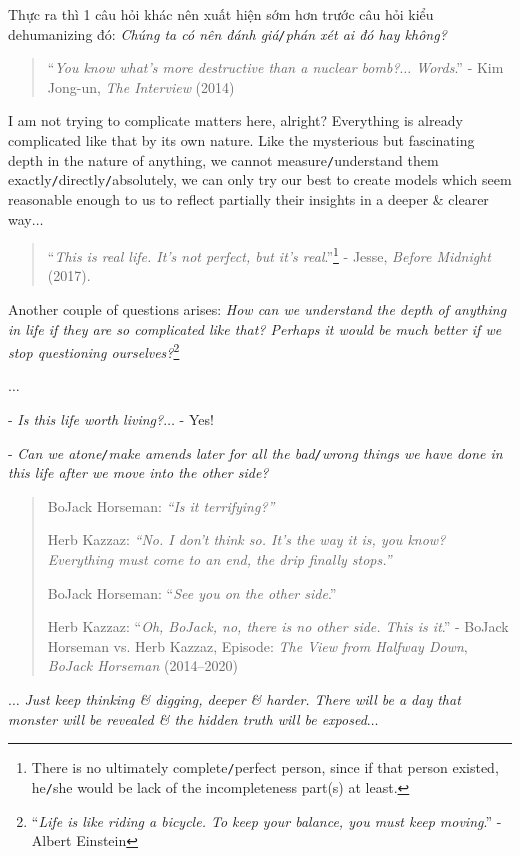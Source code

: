 \documentclass[12pt]{article}
\begin{document}
Thực ra thì 1 câu hỏi khác nên xuất hiện sớm hơn trước câu hỏi kiểu dehumanizing đó: {\it Chúng ta có nên đánh giá{\tt/}phán xét ai đó hay không?}
\begin{quotation}
	``{\it You know what's more destructive than a nuclear bomb?$\ldots$ Words}.'' - Kim Jong-un, {\it The Interview} (2014)
\end{quotation}
I am not trying to complicate matters here, alright? Everything is already complicated like that by its own nature. Like the mysterious but fascinating depth in the nature of anything, we cannot measure{\tt/}understand them exactly{\tt/}directly{\tt/}absolutely, we can only try our best to create models which seem reasonable enough to us to reflect partially their insights in a deeper \& clearer way$\ldots$

\begin{quotation}
	``{\it This is real life. It's not perfect, but it's real}.''\footnote{There is no ultimately complete{\tt/}perfect person, since if that person existed, he{\tt/}she would be lack of the incompleteness part(s) at least.} - Jesse, {\it Before Midnight} (2017).
\end{quotation}
Another couple of questions arises: {\it How can we understand the depth of anything in life if they are so complicated like that? Perhaps it would be much better if we stop questioning ourselves?}\footnote{``{\it Life is like riding a bicycle. To keep your balance, you must keep moving}.'' - Albert Einstein}

$\ldots$

- {\it Is this life worth living?}$\ldots$ - Yes!

- {\it Can we atone{\tt/}make amends later for all the bad{\tt/}wrong things we have done in this life after we move into the other side?}
\begin{quotation}    
	BoJack Horseman: {\it ``Is it terrifying?''}
	
	Herb Kazzaz: {\it ``No. I don't think so. It's the way it is, you know? Everything must come to an end, the drip finally stops.''}
	
	BoJack Horseman: ``{\it See you on the other side}.''
	
	Herb Kazzaz: ``{\it Oh, BoJack, no, there is no other side. This is it}.'' - BoJack Horseman vs. Herb Kazzaz,  Episode: {\it The View from Halfway Down}, {\it BoJack Horseman} (2014--2020)
\end{quotation}
$\ldots$ {\it Just keep thinking \& digging, deeper \& harder. There will be a day that monster will be revealed \& the hidden truth will be exposed}$\ldots$
\end{document}
